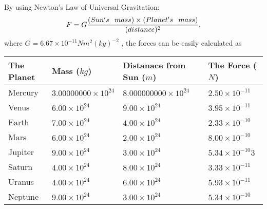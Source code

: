 \documentclass[12pt]{article}
\begin{document}
 
 
 
 
 
\noindent{}

By using Newton's Law of Universal Gravitation:
\[
F=G \frac{(Sun's \hspace{0.1in} mass) \times (Planet's \hspace{0.1in} mass)} { (distance)^2},
\]
where
$ G= %
6.67 \times 10^{-11} N m^{2}(kg)^{-2}$ , the forces can be easily calculated as
 
\vspace{0.2in}
 
 
\begin{tabular}{|l|l|l|l|}
\hline
The Planet & Mass ($kg$) & Distanace from Sun ($m$) & The Force ($N$)\\
\hline
Mercury  &
           $ %
3.00000000 \times 10^{24}  $   &
             $ %
8.000000000 \times 10^{24}$    & $ %
2.50 \times 10^{-11} $
\\  \hline
Venus    &
           $  %
6.00 \times 10^{24}  $     &
             $ %
9.00 \times 10^{24} $    & $ %
3.95 \times 10^{-11} $
\\  \hline
Earth    &
           $  %
7.00 \times 10^{24}$     &
             $ %
4.00 \times 10^{24} $    & $ %
2.33 \times 10^{-10} $
\\   \hline
Mars     &
           $  %
6.00 \times 10^{24} $     &
             $ %
2.00 \times 10^{24}$    & $ %
8.00 \times 10^{-10} $
\\   \hline
Jupiter  &
           $  %
9.00 \times 10^{24}  $    &
             $ %
3.00 \times 10^{24} $    & $ %
5.34 \times 10^{-10}3 $
\\  \hline
Saturn   &
           $  %
4.00 \times 10^{24}   $    &
             $ %
8.00 \times 10^{24}  $    & $ %
3.33 \times 10^{-11} $
\\  \hline
Uranus   &
           $  %
4.00 \times 10^{24} $    &
             $ %
6.00 \times 10^{24}$    & $ %
5.93 \times 10^{-11} $
\\  \hline
Neptune  &
           $  %
9.00 \times 10^{24}  $    &
             $ %
3.00 \times 10^{24} $    & $ %
5.34 \times 10^{-10} $
\\  \hline
 
\end{tabular}
 
 
 
 
  
\vspace{0.2in}
  
\end{document}
